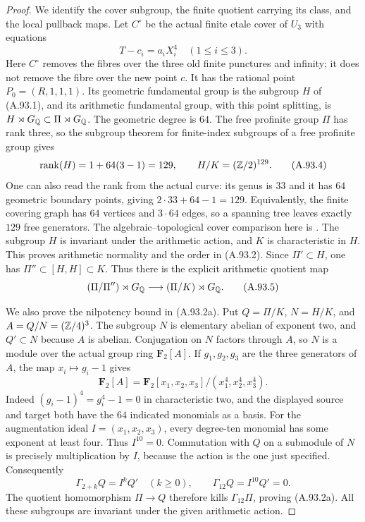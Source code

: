 \begin{proof}
We identify the cover subgroup, the finite quotient
carrying its class, and the local pullback maps.
Let $C^\circ$ be the actual finite etale cover of
$U_3$ with equations
\[
                     T-c_i=a_iX_i^4\quad(1\le i\le3).
 \tag{A.93.3}
\]
Here $C^\circ$ removes the fibres over the three
old finite punctures and infinity; it does not
remove the fibre over the new point $c$.
It has the rational point $P_0=(R,1,1,1)$.
Its geometric fundamental group is the subgroup
$H$ of (A.93.1), and its arithmetic fundamental
group, with this point splitting, is
$H\rtimes G_\mathbb Q\subset\Pi\rtimes G_\mathbb Q$.
The geometric degree is $64$.
The free profinite group $\Pi$ has rank three,
so the subgroup theorem for finite-index
subgroups of a free profinite group gives
\[
            \operatorname{rank}(H)=1+64(3-1)=129,
       \qquad H/K=(\mathbb Z/2)^{129}.
 \tag{A.93.4}
\]
One can also read the rank from the actual curve:
its genus is $33$ and it has $64$ geometric
boundary points, giving $2\cdot33+64-1=129$.
Equivalently, the finite covering graph has
$64$ vertices and $3\cdot64$ edges, so a
spanning tree leaves exactly $129$ free
generators.  The algebraic--topological
cover comparison here is
\cite[Remark 3.3(c) and Theorem 21.3]{AgentMilneLEC}.
The subgroup $H$ is invariant under the arithmetic
action, and $K$ is characteristic in $H$.
This proves arithmetic normality and the order
in (A.93.2).
Since $\Pi'\subset H$, one has
$\Pi''\subset[H,H]\subset K$.
Thus there is the explicit arithmetic quotient map
\[
       (\Pi/\Pi'')\rtimes G_\mathbb Q
                      \longrightarrow(\Pi/K)\rtimes G_\mathbb Q .
 \tag{A.93.5}
\]

We also prove the nilpotency bound in (A.93.2a).
Put $Q=\Pi/K$, $N=H/K$, and
$A=Q/N=(\mathbb Z/4)^3$.
The subgroup $N$ is elementary abelian of exponent
two, and $Q'\subset N$ because $A$ is abelian.
Conjugation on $N$ factors through $A$, so $N$
is a module over the actual group ring
$\mathbf F_2[A]$.
If $g_1,g_2,g_3$ are the three generators of $A$,
the map $x_i\mapsto g_i-1$ gives
\[
 \mathbf F_2[A]
       =\mathbf F_2[x_1,x_2,x_3]/(x_1^4,x_2^4,x_3^4).
 \tag{A.93.5a}
\]
Indeed $(g_i-1)^4=g_i^4-1=0$ in characteristic
two, and the displayed source and target both
have the $64$ indicated monomials as a basis.
For the augmentation ideal $I=(x_1,x_2,x_3)$,
every degree-ten monomial has some exponent
at least four.  Thus $I^{10}=0$.
Commutation with $Q$ on a submodule of $N$
is precisely multiplication by $I$, because
the action is the one just specified.
Consequently
\[
       \Gamma_{2+k}Q=I^k Q'\quad(k\ge0),\qquad
       \Gamma_{12}Q=I^{10}Q'=0 .
 \tag{A.93.5b}
\]
The quotient homomorphism $\Pi\to Q$ therefore
kills $\Gamma_{12}\Pi$, proving (A.93.2a).
All these subgroups are invariant under the
given arithmetic action.


\end{proof}
